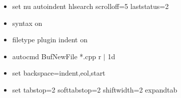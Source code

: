 \begin{itemize}\itemsep0pt
\item set nu autoindent hlsearch scrolloff=5 laststatus=2
\item syntax on
\item filetype plugin indent on
\item autocmd BufNewFile *.cpp r  $\mid$ 1d
\item set backspace=indent,eol,start
\item set tabstop=2 softtabstop=2 shiftwidth=2 expandtab
\end{itemize}
